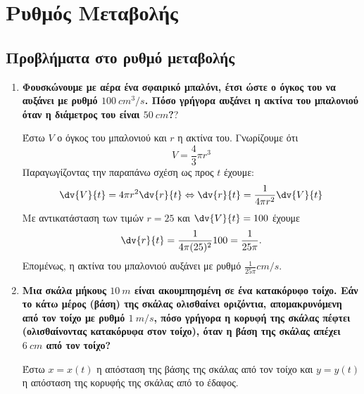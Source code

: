 





	
\chapter{Ρυθμός Μεταβολής}

\section{Προβλήματα στο ρυθμό μεταβολής}

\vspace{\baselineskip}

\begin{enumerate}
	\item {\bfseries \boldmath    Φουσκώνουμε με αέρα ένα σφαιρικό μπαλόνι, έτσι
		ώστε ο όγκος του να αυξάνει με ρυθμό $\SI{100}{cm^{3}/s}$. Πόσο γρήγορα
	αυξάνει η ακτίνα του μπαλονιού όταν η διάμετρος του είναι $\SI{50}{cm}$?}?


		\vspace{\baselineskip}

		Έστω $V$ ο όγκος του μπαλονιού και $r$ η ακτίνα του.
		Γνωρίζουμε ότι
		\[
			V=\frac{4}{3}\pi r^{3}
		\]
		Παραγωγίζοντας την παραπάνω σχέση ως προς $t$ έχουμε:
		\[
			\dv{V}{t} = 4\pi r^{2}\dv{r}{t} \Leftrightarrow
			\dv{r}{t} = \frac{1}{4\pi r^{2}}\dv{V}{t}
		\]
		Με αντικατάσταση των τιμών $r=25$ και $\dv{V}{t}=100$ έχουμε
		\[
			\dv{r}{t} = \frac{1}{4\pi (25)^{2}}100 = \frac{1}{25\pi}.
		\]
		Επομένως, η ακτίνα του μπαλονιού αυξάνει με ρυθμό $\frac{1}{25\pi}\si{cm\per s}$.

	\item {\bfseries \boldmath Μια σκάλα μήκους $\SI{10}{m}$ είναι ακουμπησμένη
		σε ένα κατακόρυφο τοίχο. Εάν το κάτω μέρος (βάση) της σκάλας ολισθαίνει
	οριζόντια, απομακρυνόμενη από τον τοίχο με ρυθμό $\SI{1}{m\per s}$, πόσο
γρήγορα η κορυφή της σκάλας πέφτει (ολισθαίνοντας κατακόρυφα στον τοίχο), όταν η
βάση της σκάλας απέχει $\SI{6}{cm}$ από τον τοίχο?}


		\vspace{\baselineskip}

		Έστω $x=x(t)$ η απόσταση της βάσης της σκάλας από τον τοίχο και $y=y(t)$ η απόσταση της κορυφής της σκάλας από το έδαφος.


\end{enumerate}
